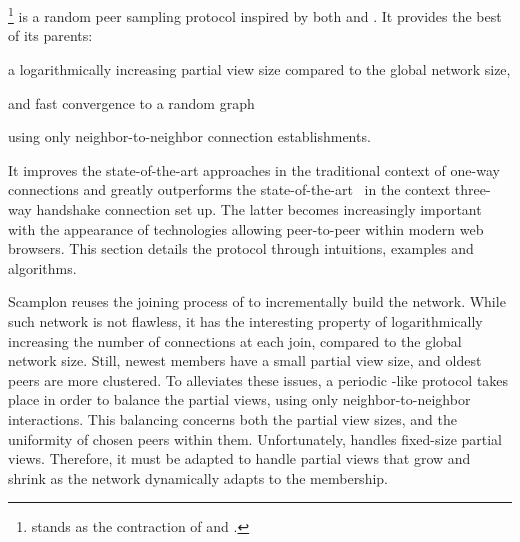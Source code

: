 
\section{\SCAMPLON{}}
\label{sec:proposal}

\SCAMPLON{}\footnote{\SCAMPLON{} stands as the contraction of \SCAMP{} and
  \CYCLON{}.} is a random peer sampling protocol inspired by both \SCAMP{} and
\CYCLON{}. It provides the best of its parents: 
\begin{inparaenum}[(i)]
\item a logarithmically increasing partial view size compared to the global
  network size,
\item and fast convergence to a random graph
\item using only neighbor-to-neighbor connection establishments.
\end{inparaenum}
It improves the state-of-the-art approaches in the traditional context of
one-way connections and greatly outperforms the
state-of-the-art~\cite{ganesh2001scamp,voulgaris2005cyclon} in the context
three-way handshake connection set up.  The latter becomes increasingly
important with the appearance of technologies allowing peer-to-peer within
modern web browsers. This section details the \SCAMPLON{} protocol through
intuitions, examples and algorithms.

\begin{asparadesc}
\item [Scamplon] reuses the joining process of \SCAMP{} to incrementally build
  the network. While such network is not flawless, it has the interesting
  property of logarithmically increasing the number of connections at each
  join, compared to the global network size. Still, newest members have a small
  partial view size, and oldest peers are more clustered. To alleviates these
  issues, a periodic \CYCLON{}-like protocol takes place in order to balance
  the partial views, using only neighbor-to-neighbor interactions. This
  balancing concerns both the partial view sizes, and the uniformity of chosen
  peers within them. Unfortunately, \CYCLON{} handles fixed-size partial
  views. Therefore, it must be adapted to handle partial views that grow and
  shrink as the network dynamically adapts to the membership.
\end{asparadesc}

